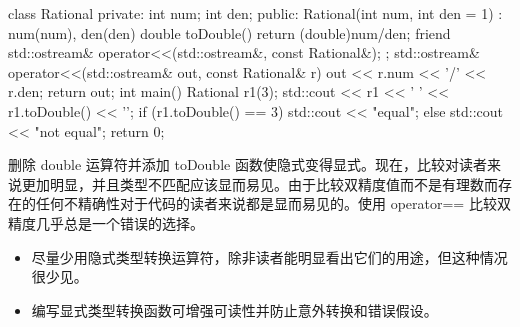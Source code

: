 
\begin{cpp}
class Rational {
private:
  int num;
  int den;
public:
  Rational(int num, int den = 1) : num(num), den(den) {}
  double toDouble() { return (double)num/den; }
  friend std::ostream& operator<<(std::ostream&, const Rational&);
};
std::ostream& operator<<(std::ostream& out, const Rational& r) {
  out << r.num << '/' << r.den;
  return out;
}
int main() {
  Rational r1(3);
  std::cout << r1 << ' ' << r1.toDouble() << '\n';
  if (r1.toDouble() == 3)
    std::cout << "equal\n";
  else
    std::cout << "not equal\n";
  return 0;
}
\end{cpp}

删除 double 运算符并添加 toDouble 函数使隐式变得显式。现在，比较对读者来说更加明显，并且类型不匹配应该显而易见。由于比较双精度值而不是有理数而存在的任何不精确性对于代码的读者来说都是显而易见的。使用 operator== 比较双精度几乎总是一个错误的选择。


\begin{itemize}
\item
尽量少用隐式类型转换运算符，除非读者能明显看出它们的用途，但这种情况很少见。

\item
编写显式类型转换函数可增强可读性并防止意外转换和错误假设。
\end{itemize}
